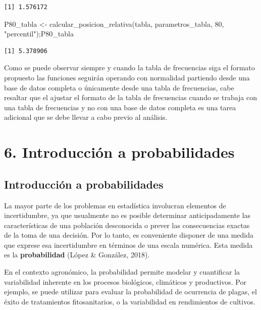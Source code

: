 \documentclass[
  spanish,
  letterpaper,
]{book}
\newenvironment{Shaded}{\begin{snugshade}}{\end{snugshade}}
\newcommand{\DecValTok}[1]{\textcolor[rgb]{0.68,0.00,0.00}{#1}}
\newcommand{\FunctionTok}[1]{\textcolor[rgb]{0.28,0.35,0.67}{#1}}
\newcommand{\NormalTok}[1]{\textcolor[rgb]{0.00,0.23,0.31}{#1}}
\newcommand{\OtherTok}[1]{\textcolor[rgb]{0.00,0.23,0.31}{#1}}
\newcommand{\StringTok}[1]{\textcolor[rgb]{0.13,0.47,0.30}{#1}}
\begin{document}
\begin{enumerate}
\begin{verbatim}
[1] 1.576172
\end{verbatim}

\begin{Shaded}
\begin{Highlighting}[]
\NormalTok{P80\_tabla }\OtherTok{\textless{}{-}} \FunctionTok{calcular\_posicion\_relativa}\NormalTok{(tabla, parametros\_tabla,}
                                        \DecValTok{80}\NormalTok{, }\StringTok{"percentil"}\NormalTok{);P80\_tabla}
\end{Highlighting}
\end{Shaded}

\begin{verbatim}
[1] 5.378906
\end{verbatim}
\end{enumerate}

Como se puede observar siempre y cuando la tabla de frecuencias siga el
formato propuesto las funciones seguirán operando con normalidad
partiendo desde una base de datos completa o únicamente desde una tabla
de frecuencias, cabe resaltar que el ajustar el formato de la tabla de
frecuencias cuando se trabaja con una tabla de frecuencias y no con una
base de datos completa es una tarea adicional que se debe llevar a cabo
previo al análisis.

\part{6. Introducción a probabilidades}


\chapter{Introducción a
probabilidades}\label{introducciuxf3n-a-probabilidades-1}

La mayor parte de los problemas en estadística involucran elementos de
incertidumbre, ya que usualmente no es posible determinar
anticipadamente las características de una población desconocida o
prever las consecuencias exactas de la toma de una decisión. Por lo
tanto, es conveniente disponer de una medida que exprese esa
incertidumbre en términos de una escala numérica. Esta medida es la
\textbf{probabilidad} (López \& González, 2018).

En el contexto agronómico, la probabilidad permite modelar y cuantificar
la variabilidad inherente en los procesos biológicos, climáticos y
productivos. Por ejemplo, se puede utilizar para evaluar la probabilidad
de ocurrencia de plagas, el éxito de tratamientos fitosanitarios, o la
variabilidad en rendimientos de cultivos.
\end{document}
